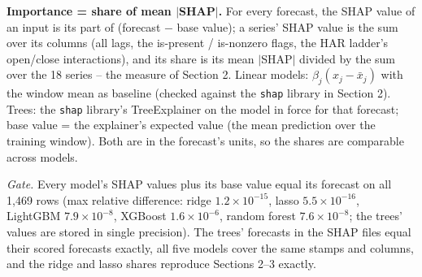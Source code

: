 \documentclass[10pt]{article}
\begin{document}
\textbf{Importance = share of mean $|$SHAP$|$.} For every forecast, the SHAP value of an input is its part of (forecast $-$ base value); a series' SHAP value is the sum over its columns (all lags, the is-present / is-nonzero flags, the HAR ladder's open/close interactions), and its share is its mean $|$SHAP$|$ divided by the sum over the 18 series -- the measure of Section 2. Linear models: $\beta_j(x_j-\bar x_j)$ with the window mean as baseline (checked against the \texttt{shap} library in Section 2). Trees: the \texttt{shap} library's TreeExplainer on the model in force for that forecast; base value = the explainer's expected value (the mean prediction over the training window). Both are in the forecast's units, so the shares are comparable across models.

\emph{Gate.} Every model's SHAP values plus its base value equal its forecast on all 1,469 rows (max relative difference: ridge $1.2\times10^{-15}$, lasso $5.5\times10^{-16}$, LightGBM $7.9\times10^{-8}$, XGBoost $1.6\times10^{-6}$, random forest $7.6\times10^{-8}$; the trees' values are stored in single precision). The trees' forecasts in the SHAP files equal their scored forecasts exactly, all five models cover the same stamps and columns, and the ridge and lasso shares reproduce Sections 2--3 exactly.
\end{document}
